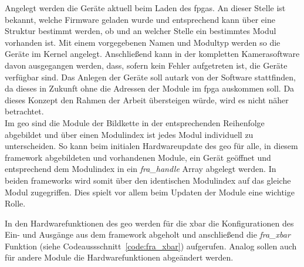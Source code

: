 Angelegt werden die Geräte aktuell beim Laden des \ac{fpga}s. An dieser Stelle ist bekannt, welche Firmware geladen wurde und entsprechend kann über eine Struktur bestimmt werden, ob und an welcher Stelle ein bestimmtes Modul vorhanden ist. Mit einem vorgegebenen Namen und Modultyp werden so die Geräte im Kernel angelegt. Anschließend kann in der kompletten Kamerasoftware davon ausgegangen werden, dass, sofern kein Fehler aufgetreten ist, die Geräte verfügbar sind. Das Anlegen der Geräte soll autark von der Software stattfinden, da dieses in Zukunft ohne die Adressen der Module im \ac{fpga} auskommen soll. Da dieses Konzept den Rahmen der Arbeit übersteigen würde, wird es nicht näher betrachtet. \\

Im \ac{geo} sind die Module der Bildkette in der entsprechenden Reihenfolge abgebildet und über einen Modulindex ist jedes Modul individuell zu unterscheiden. So kann beim initialen Hardwareupdate des \ac{geo} für alle, in diesem \gls{framework} abgebildeten und vorhandenen Module, ein Gerät geöffnet und entsprechend dem Modulindex in ein \textit{fra\_handle} Array abgelegt werden. In beiden \glspl{framework} wird somit über den identischen Modulindex auf das gleiche Modul zugegriffen. Dies spielt vor allem beim Updaten der Module eine wichtige Rolle.


In den Hardwarefunktionen des \ac{geo} werden für die \ac{xbar} die Konfigurationen des Ein- und Ausgänge aus dem \gls{framework} abgeholt und anschließend die \textit{fra\_xbar} Funktion (siehe Codeaussschnitt~\ref{code:fra_xbar}) aufgerufen. Analog sollen auch für andere Module die Hardwarefunktionen abgeändert werden.








